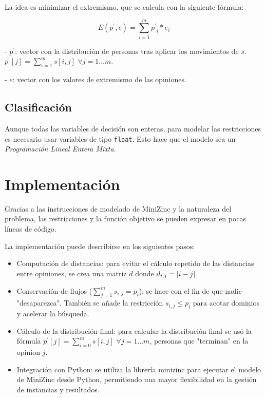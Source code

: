 La idea es minimizar el extremismo, que se calcula con la siguiente fórmula:

\begin{equation}
	E(p^\prime,e) = \sum_{ i = 1 }^m { p^\prime }_i * e_i
\end{equation}

- $p^\prime$: vector con la distribución de personas tras aplicar los movimientos de $s$. $p^\prime[j] = \sum_{ i = 1 }^m s[i,j]$ $\forall j = 1\dots m$.

- $e$: vector con los valores de extremismo de las opiniones.

\subsection{Clasificación}

Aunque todas las variables de decisión son enteras, para modelar las restricciones es necesario usar variables de tipo \texttt{float}. Esto hace que el modelo sea un \emph{Programación Lineal Entera Mixta}.

\section{Implementación}

Gracias a las instrucciones de modelado de MiniZinc y la naturaleza del problema, las restricciones y la función objetivo se pueden expresar en pocas líneas de código.

La implementación puede describirse en los siguientes pasos:

\begin{itemize}
	\item Computación de distancias: para evitar el cálculo repetido de las distancias entre opiniones, se crea una matriz $d$ donde $d_{ i,j } = \left \lvert  i - j  \right \rvert$.

	\item Conservación de flujos ($\sum_{ j = 1 }^m s_{ i,j } = p_i$): se hace con el fin de que nadie "desaparezca". También se añade la restricción $s_{ i,j } \leq p_i$ para acotar dominios y acelerar la búsqueda.

	\item Cálculo de la distribución final: para calcular la distribución final se usó la fórmula $p^\prime[j] = \sum_{ i = 0 }^m s[i,j]$ $\forall j = 1\dots m$, personas que "terminan" en la opinion $j$.

	\item Integración con Python: se utiliza la librería minizinc para ejecutar el modelo de MiniZinc desde Python, permitiendo una mayor flexibilidad en la gestión de instancias y resultados.
\end{itemize}

